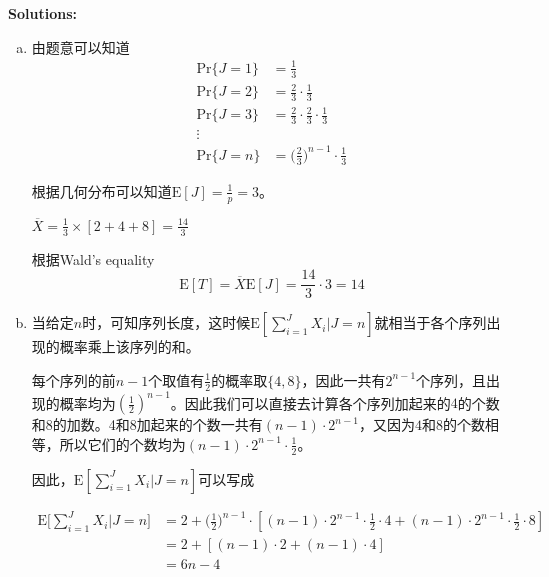 \documentclass{article}
\begin{document}
    \textbf{Solutions:}
    \begin{enumerate}[(a)]
        \item 由题意可以知道
            \begin{equation*}
                \begin{aligned}
                    \text{Pr}\{J=1\}&=\frac{1}{3}\\
                    \text{Pr}\{J=2\}&=\frac{2}{3}\cdot\frac{1}{3}\\
                    \text{Pr}\{J=3\}&=\frac{2}{3}\cdot\frac{2}{3}\cdot\frac{1}{3}\\
                    \vdots\\
                    \text{Pr}\{J=n\}&=\bigg(\frac{2}{3}\bigg)^{n-1}\cdot\frac{1}{3}
                \end{aligned}              
            \end{equation*}

            根据几何分布可以知道$\text{E}[J]=\frac{1}{p}=3$。
            
            $\overline{X}=\frac{1}{3}\times[2+4+8]=\frac{14}{3}$

            根据Wald's equality
            \begin{equation*}
                \text{E}[T]=\overline{X}\text{E}[J]=\frac{14}{3}\cdot 3=14
            \end{equation*}

        \item 
            当给定$n$时，可知序列长度，这时候$\text{E}[\sum_{i=1}^JX_i|J=n]$就相当于各个序列出现的概率乘上该序列的和。

            每个序列的前$n-1$个取值有$\frac{1}{2}$的概率取$\{4,8\}$，因此一共有$2^{n-1}$个序列，且出现的概率均为$(\frac{1}{2})^{n-1}$。因此我们可以直接去计算各个序列加起来的$4$的个数和$8$的加数。4和8加起来的个数一共有$(n-1)\cdot 2^{n-1}$，又因为$4$和$8$的个数相等，所以它们的个数均为$(n-1)\cdot 2^{n-1}\cdot\frac{1}{2}$。

            因此，$\text{E}[\sum_{i=1}^JX_i|J=n]$可以写成

            \begin{equation*}
                \begin{split}
                    \text{E}\bigg[\sum_{i=1}^JX_i|J=n\bigg] &= 2+\bigg(\frac{1}{2}\bigg)^{n-1}\cdot[(n-1)\cdot2^{n-1}\cdot\frac{1}{2}\cdot4+(n-1)\cdot2^{n-1}\cdot\frac{1}{2}\cdot8]\\
                    &=2+[(n-1)\cdot2+(n-1)\cdot4]\\
                    &=6n-4
                \end{split}
            \end{equation*}
            

\end{enumerate}
\end{document}
